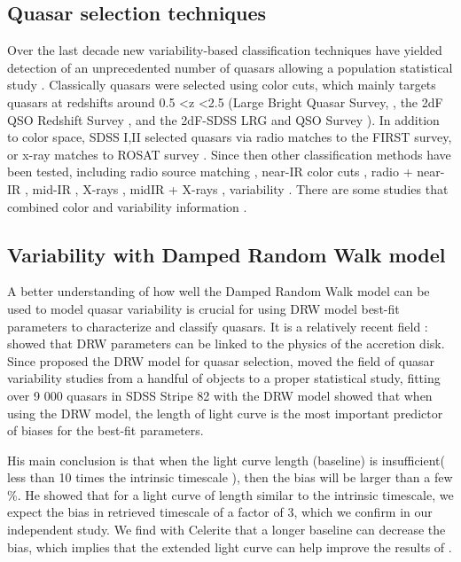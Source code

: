 \documentclass[modern]{aastex62}
\begin{document}
\subsection{Quasar selection techniques}
Over the last decade new variability-based classification techniques have yielded detection of an unprecedented number of quasars allowing a population statistical study \citep{fan2001, richards2006, kozlowski2010, palanque2011, macleod2011, graham2014, alsayyad2016, ruan2017}. Classically quasars were selected using color cuts,  which mainly targets quasars at redshifts around 0.5 \textless  z \textless 2.5 (Large Bright Quasar Survey, \cite{hewett1995}, the 2dF QSO Redshift Survey \cite{croom2004}, and the 2dF-SDSS LRG and QSO Survey \cite{croom2009}).  In addition to color space, SDSS I,II selected quasars via radio matches to the FIRST survey, or x-ray matches to ROSAT survey \citep{myers2015}. Since then other classification methods have been tested, including radio source matching \citep{mcgreer2009}, near-IR color cuts \citep{banerji2012},  radio + near-IR \citep{glikman2012}, mid-IR \citep{stern2005, richards2009a, stern2012}, X-rays \citep{trichas2012},  midIR + X-rays \citep{lacy2004, hickox2007, hickox2009}, variability \citep{schmidt2010, butler2011, macleod2011, palanque2011,palanque2016}. There are some studies that combined color and variability information \citep{tie2017, peters2015, sesar2007}. 

\subsection{Variability with Damped Random Walk model}
A better understanding of how well the Damped Random Walk model can be used to model quasar variability is crucial for using DRW model best-fit parameters to characterize and classify quasars. It is a relatively recent field : \cite{kelly2009} showed that DRW parameters can be linked to the physics of the accretion disk. Since \cite{kozlowski2010} proposed the DRW model for quasar selection, \cite{macleod2010} moved the field of quasar variability studies from a handful of objects to a proper statistical study, fitting over 9 000 quasars in SDSS Stripe 82 with the DRW model \cite{graham2017,kozlowski2017a} showed that when using the  DRW model, the length of light curve is the most important predictor of biases for the best-fit parameters. 

His main conclusion is that when the light curve length (baseline) is insufficient( less than 10 times the intrinsic timescale ), then the bias will be larger than a few \%. He showed that for a light curve of length similar to the intrinsic timescale, we expect the bias in retrieved timescale of a factor of 3, which we confirm in our independent study.  We find with Celerite that a longer baseline can decrease the bias, which implies that the extended light curve can help improve the results of \cite{macleod2011}.  
\end{document}
